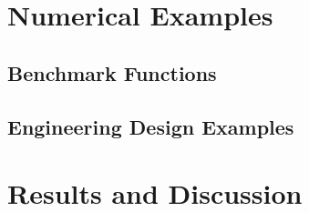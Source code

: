 \section{Numerical Examples}
\label{sec:numex} 

\subsection{Benchmark Functions}

\subsection{Engineering Design Examples}

\section{Results and Discussion}
\label{sec:results}



